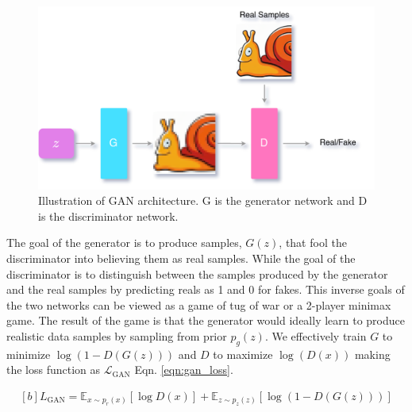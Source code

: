 \begin{figure}[!h]
    \centering
    \includegraphics[scale=0.2]{figures/arch/gan_arch.png}
    \caption{Illustration of GAN architecture. G is the generator network and D is the discriminator network.}
    \label{fig:gan_arch}
\end{figure}

The goal of the generator is to produce samples, $G(z)$, that fool the discriminator into believing them as real samples. While the goal of the discriminator is to distinguish between the samples produced by the generator and the real samples by predicting reals as 1 and 0 for fakes. This inverse goals of the two networks can be viewed as a game of tug of war or a 2-player minimax game. The result of the game is that the generator would ideally learn to produce realistic data samples by sampling from prior $p_{g}(z)$. We effectively train $G$ to minimize $\log(1-D(G({z})))$ and $D$ to maximize $\log(D(x))$ making the loss function as $\mathcal{L}_{\mathrm{GAN}}$ Eqn. \ref{eqn:gan_loss}.

\begin{equation} \label{eqn:gan_loss}
    \begin{gathered}[b]
        {L}_{\mathrm{GAN}}=\mathbb{E}_{{x} \sim p_{r}(x)}[\log D({x})]+\mathbb{E}_{{z} \sim p_{z}(z)}[\log (1-D(G({z})))]
    \end{gathered}
\end{equation}

